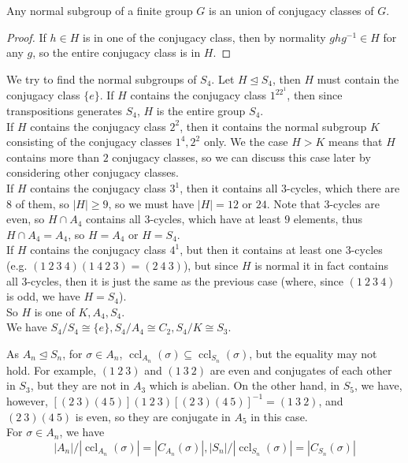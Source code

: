 \begin{corollary}
    Any normal subgroup of a finite group $G$ is an union of conjugacy classes of $G$.
\end{corollary}
\begin{proof}
    If $h\in H$ is in one of the conjugacy class, then by normality $ghg^{-1}\in H$ for any $g$, so the entire conjugacy class is in $H$.
\end{proof}
\begin{example}
    We try to find the normal subgroups of $S_4$.
    Let $H\unlhd S_4$, then $H$ must contain the conjugacy class $\{e\}$.
    If $H$ contains the conjugacy class $1^22^1$, then since transpositions generates $S_4$, $H$ is the entire group $S_4$.\\
    If $H$ contains the conjugacy class $2^2$, then it contains the normal subgroup $K$ consisting of the conjugacy classes $1^4,2^2$ only.
    We the case $H>K$ means that $H$ contains more than $2$ conjugacy classes, so we can discuss this case later by considering other conjugacy classes.\\
    If $H$ contains the conjugacy class $3^1$, then it contains all $3$-cycles, which there are $8$ of them, so $|H|\ge 9$, so we must have $|H|=12$ or $24$.
    Note that $3$-cycles are even, so $H\cap A_4$ contains all $3$-cycles, which have at least $9$ elements, thus $H\cap A_4=A_4$, so $H=A_4$ or $H=S_4$.\\
    If $H$ contains the conjugacy class $4^1$, but then it contains at least one $3$-cycles (e.g. $(1\ 2\ 3\ 4)(1\ 4\ 2\ 3)=(2\ 4\ 3)$), but since $H$ is normal it in fact contains all $3$-cycles, then it is just the same as the previous case (where, since $(1\ 2\ 3\ 4)$ is odd, we have $H=S_4$).\\
    So $H$ is one of $K,A_4,S_4$.\\
    We have $S_4/S_4\cong \{e\},S_4/A_4\cong C_2, S_4/K\cong S_3$.
\end{example}
As $A_n\unlhd S_n$, for $\sigma\in A_n$, $\operatorname{ccl}_{A_n}(\sigma)\subseteq\operatorname{ccl}_{S_n}(\sigma)$, but the equality may not hold.
For example, $(1\ 2\ 3)$ and $(1\ 3\ 2)$ are even and conjugates of each other in $S_3$, but they are not in $A_3$ which is abelian.
On the other hand, in $S_5$, we have, however, $[(2\ 3)(4\ 5)](1\ 2\ 3)[(2\ 3)(4\ 5)]^{-1}=(1\ 3\ 2)$, and $(2\ 3)(4\ 5)$ is even, so they are conjugate in $A_5$ in this case.\\
For $\sigma\in A_n$, we have
$$|A_n|/|\operatorname{ccl}_{A_n}(\sigma)|=|C_{A_n}(\sigma)|,|S_n|/|\operatorname{ccl}_{S_n}(\sigma)|=|C_{S_n}(\sigma)|$$
